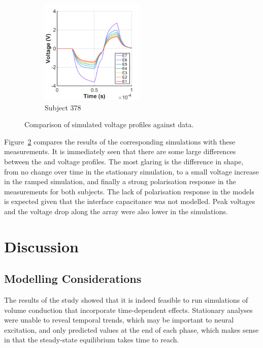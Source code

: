 \begin{figure}
    \begin{subfigure}[t]{0.4\textwidth}
        \centering
        \includegraphics[height=5cm]{Simulations/TimeDep/shefin_data-12_378}
        \caption{Subject 378}
        \label{fig:td_valid_shefin_378}
    \end{subfigure}
    
	\caption[Comparison of simulated voltage profiles against \invivo{}
	data]{Comparison of simulated voltage profiles against \invivo{}
	data.}
	\label{fig:td_validation}
\end{figure}

Figure~\ref{fig:td_validation} compares the results of the corresponding
simulations with these \invivo{} measurements. It is immediately seen that there
are some large differences between the \insilico{} and \invivo{} voltage
profiles. The most glaring is the difference in shape, from no change over time
in the stationary simulation, to a small voltage increase in the ramped
simulation, and finally a strong polarisation response in the \invivo{}
measurements for both subjects. The lack of polarisation response in the
models is expected given that the interface capacitance was not modelled. Peak
voltages and the voltage drop along the array were also lower in the simulations.

\section{Discussion}

\subsection{Modelling Considerations}

The results of the study showed that it is indeed feasible to run simulations of
volume conduction that incorporate time-dependent effects. Stationary analyses
were unable to reveal temporal trends, which may be important to neural
excitation, and only predicted values at the end of each phase, which makes
sense in that the steady-state equilibrium takes time to reach.


